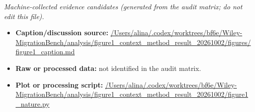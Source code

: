 \emph{Machine-collected evidence candidates (generated from the audit matrix; do not edit this file).}
\begin{itemize}[leftmargin=1.4em,noitemsep]
\item \textbf{Caption/discussion source:} \url{/Users/alina/.codex/worktrees/bf6e/Wiley-MigrationBench/analysis/figure1_context_method_result_20261002/figures/figure1_caption.md}
\item \textbf{Raw or processed data:} not identified in the audit matrix.
\item \textbf{Plot or processing script:} \url{/Users/alina/.codex/worktrees/bf6e/Wiley-MigrationBench/analysis/figure1_context_method_result_20261002/figure1_nature.py}
\end{itemize}
